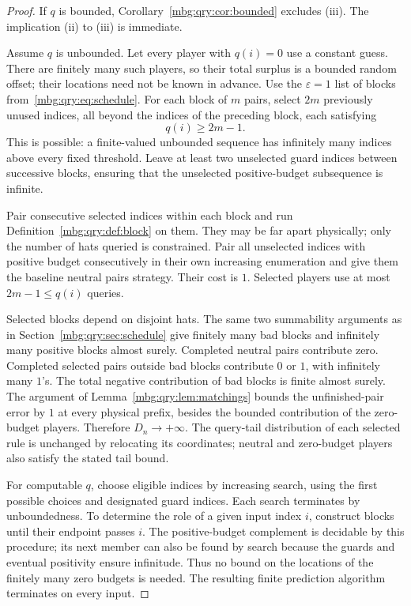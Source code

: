 \documentclass[11pt,letterpaper]{article}
\theoremstyle{definition}
\begin{document}
\begin{proof}
If \(q\) is bounded, Corollary~\ref{mbg:qry:cor:bounded} excludes (iii).
The implication (ii) to (iii) is immediate.

Assume \(q\) is unbounded. Let every player with \(q(i)=0\) use a
constant guess. There are finitely many such players, so their total
surplus is a bounded random offset; their locations need not be known
in advance.
Use the \(\varepsilon=1\) list of blocks from~\eqref{mbg:qry:eq:schedule}.
For each block of \(m\) pairs, select \(2m\) previously unused indices,
all beyond the indices of the preceding block, each satisfying
\[
 q(i)\ge2m-1.
\]
This is possible: a finite-valued unbounded sequence has infinitely many
indices above every fixed threshold. Leave at least two unselected
guard indices between successive blocks, ensuring that the unselected
positive-budget subsequence is infinite.

Pair consecutive selected indices within each block and run
Definition~\ref{mbg:qry:def:block} on them. They may be far apart physically;
only the number of hats queried is constrained. Pair all unselected
indices with positive budget consecutively in their own increasing
enumeration and give them the baseline neutral pairs strategy.
Their cost is \(1\).
Selected players use at most \(2m-1\le q(i)\) queries.

Selected blocks depend on disjoint hats. The same two summability
arguments as in Section~\ref{mbg:qry:sec:schedule} give finitely many bad blocks
and infinitely many positive blocks almost surely. Completed neutral
pairs contribute zero. Completed selected pairs outside bad blocks
contribute \(0\) or \(1\), with infinitely many \(1\)'s.
The total negative contribution of bad blocks is finite almost surely.
The argument of Lemma~\ref{mbg:qry:lem:matchings} bounds the unfinished-pair
error by \(1\) at every physical prefix, besides the bounded contribution
of the zero-budget players. Therefore \(D_n\to+\infty\).
The query-tail distribution of each selected rule is unchanged by
relocating its coordinates; neutral and zero-budget players also satisfy
the stated tail bound.

For computable \(q\), choose eligible indices by increasing search,
using the first possible choices and designated guard indices.
Each search terminates by unboundedness. To determine the role of a
given input index \(i\), construct blocks until their endpoint passes
\(i\). The positive-budget complement is decidable by this procedure;
its next member can also be found by search because the guards and
eventual positivity ensure infinitude. Thus no bound on the locations
of the finitely many zero budgets is needed.
The resulting finite prediction algorithm terminates on every input.
\end{proof}
\end{document}
